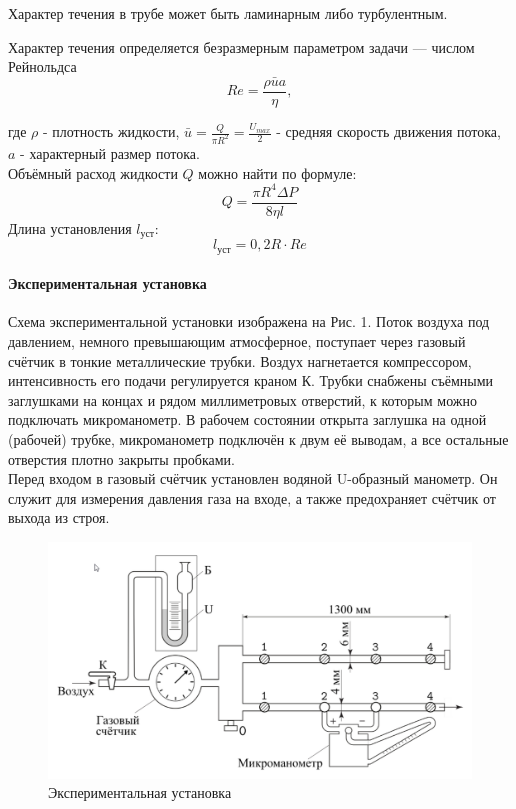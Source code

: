 \documentclass[a4paper,12pt]{article}
\begin{document}
Характер течения в трубе может быть ламинарным либо турбулентным. 

Характер течения определяется безразмерным параметром задачи — числом Рейнольдса
\begin{equation}
    Re = \frac{\rho \bar u a}{\eta},
\end{equation}

где $\rho$ - плотность жидкости, $\bar u = \frac{Q}{\pi R^2} = \frac{U_{max}}{2}$ - средняя скорость движения потока, $a$ - характерный размер потока.\\
Объёмный расход жидкости $Q$ можно найти по формуле:
\begin{equation}
    Q=\frac{\pi R^4 \Delta P}{8\eta l}
\end{equation}
Длина установления $l_{уст}$:
\begin{equation}
    l_{уст}=0,2R \cdot Re
\end{equation}
\paragraph{Экспериментальная установка\\}
Схема экспериментальной установки изображена на Рис. 1. Поток воздуха
под давлением, немного превышающим атмосферное, поступает через газовый счётчик в тонкие металлические трубки. Воздух нагнетается компрессором, интенсивность его подачи регулируется краном К. Трубки снабжены
съёмными заглушками на концах и рядом миллиметровых отверстий, к которым можно подключать микроманометр. В рабочем состоянии открыта заглушка на одной (рабочей) трубке, микроманометр подключён к двум её выводам, а все остальные отверстия плотно закрыты пробками.\\
Перед входом в газовый счётчик установлен водяной U-образный манометр. Он служит для измерения давления газа на входе, а также предохраняет
счётчик от выхода из строя.
\begin{figure}[!h]
\centering
\includegraphics[width=0.8\linewidth]{Экспериментальная установка.png}
\caption{Экспериментальная установка}
\label{fig:mpr}
\end{figure}
\end{document}
